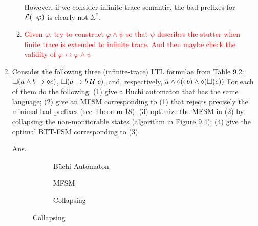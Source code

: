 \begin{enumerate}
\begin{enumerate}[(1)]
However, if we consider infinite-trace semantic,
the bad-prefixes for $\mathcal{L}(\neg\varphi)$ is clearly not $\Sigma^*$.

\item 

\textcolor{red}{
Given $\varphi$, try to construct $ \varphi \land \psi$ so that
$\psi$ describes the stutter when finite trace is extended to infinite trace.
And then maybe check the validity of $\varphi \leftrightarrow \varphi \land \psi$
}

\end{enumerate}


\item Consider the following three (infinite-trace) LTL formulae from Table 9.2:
$\square(a\land b \to \diamond c)$, $\square(a \to b \ \mathcal{U}\  c)$, and,
respectively, $a\land\circ(\diamond b)\land \diamond(\square(e))$
For each of them do the following:
(1) give a Buchi automaton that has the same language;
(2) give an MFSM corresponding to (1) that rejects precisely the minimal bad
prefixes (see Theorem 18);
(3) optimize the MFSM in (2) by collapsing the non-monitorable states (algorithm
in Figure 9.4);
(4) give the optimal BTT-FSM corresponding to (3).

Ans.

\renewcommand{\thesubfigure}{\arabic{subfigure}}
\begin{figure}[H]
	\centering
	\caption{$\square(a\land b \to \diamond c)$}
\begin{subfigure}[t]{0.35\textwidth}
	\centering
	\caption{B\"uchi Automaton}
\end{subfigure}
\begin{subfigure}[t]{0.35\textwidth}
	\centering
	\caption{MFSM}
\end{subfigure}
\begin{subfigure}[t]{0.2\textwidth}
	\caption{Collapsing}
	\centering
\end{subfigure}
\end{figure}
\end{enumerate}
